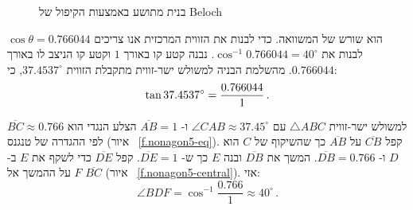 \begin{figure}
\begin{center}
\end{center}
\caption{בנית מתושע באמצעות הקיפול של Beloch}\label{f.nonagon-beloch}
\end{figure}

$\cos\theta=0.766044$
הוא שורש של המשוואה. כדי לבנות את הזווית המרכזית אנו צריכים לבנות  את
$\cos^{-1} 0.766044=40^\circ$.
נבנה קטע קו באורך
$1$
וקטע קו הניצב לו באורך 
$0.766044$.
מהשלמת הבניה למשולש ישר-זווית מתקבלת הזווית
$37.4537^\circ$,
כי:
\[
\tan 37.4537^\circ = \displaystyle\frac{0.766044}{1}\,.
\]

למשולש ישר-זווית
$\triangle ABC$
עם 
$\angle CAB\approx 37.45^\circ$
ו-%
$\overline{AB}=1$
הצלע הנגדי הוא
$\overline{BC}\approx 0.766$
לפי ההגדרה של טנגנס (איור%
~\ref{f.nonagon5-eq}).
קפל 
$\overline{CB}$
על
$\overline{AB}$
כך שהשיקוף של
$C$
הוא
$D$
ו-%
$\overline{DB}=0.766$.
המשך את
$\overline{DB}$
ובנה
$E$
כך ש-%
$\overline{DE}=1$.
קפל
$\overline{DE}$
כדי לשקף את
$E$ 
ב-%
$F$
על ההמשך אל
$\overline{BC}$
(איור%
~\ref{f.nonagon5-central}).
אזי:
\[
\angle BDF=\cos^{-1} \frac{0.766}{1}\approx 40^\circ\,.
\]


